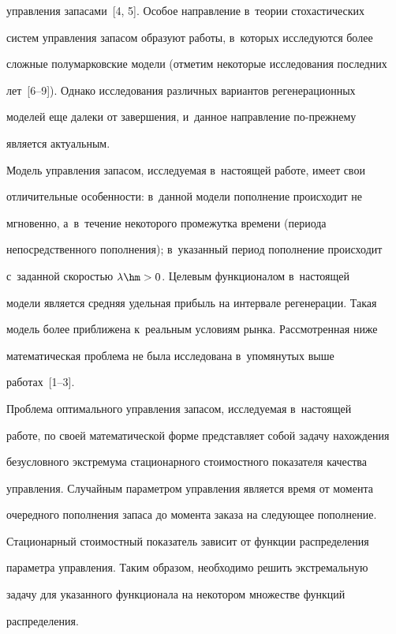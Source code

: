 управления запасами~[4, 5]. Особое направление в~теории стохастических 

систем управления запасом образуют работы, в~которых исследуются более 

сложные полумарковские модели (отметим некоторые исследования последних 

лет~[6--9]). Однако исследования различных вариантов регенерационных 

моделей еще далеки от  завершения, и~данное направление по-преж\-не\-му 

является актуальным.

  

  Модель управления запасом, исследуемая в~настоящей работе, имеет свои 

отличительные особенности: в~данной модели пополнение происходит не 

мгновенно, а~в~течение некоторого промежутка времени (периода 

непосредственного пополнения); в~указанный период пополнение происходит 

с~заданной скоростью $\lambda\hm>0$. Целевым функционалом в~настоящей 

модели является средняя удельная прибыль на интервале регенерации. Такая 

модель более приближена к~реальным условиям рынка. Рассмотренная ниже 

математическая проблема не была исследована в~упомянутых выше  

работах~[1--3].

  

  Проблема оптимального управления запасом, исследуемая в~настоящей 

работе, по своей математической форме представляет собой задачу нахождения 

безусловного экстремума стационарного стоимостного показателя качества 

управления. Случайным параметром управления является время от момента 

очередного пополнения запаса до момента заказа на следующее пополнение. 

Стационарный стоимостный показатель зависит от функции распределения 

параметра управления. Таким образом, необходимо решить экстремальную 

задачу для указанного функционала на некотором множестве функций 

распределения.

